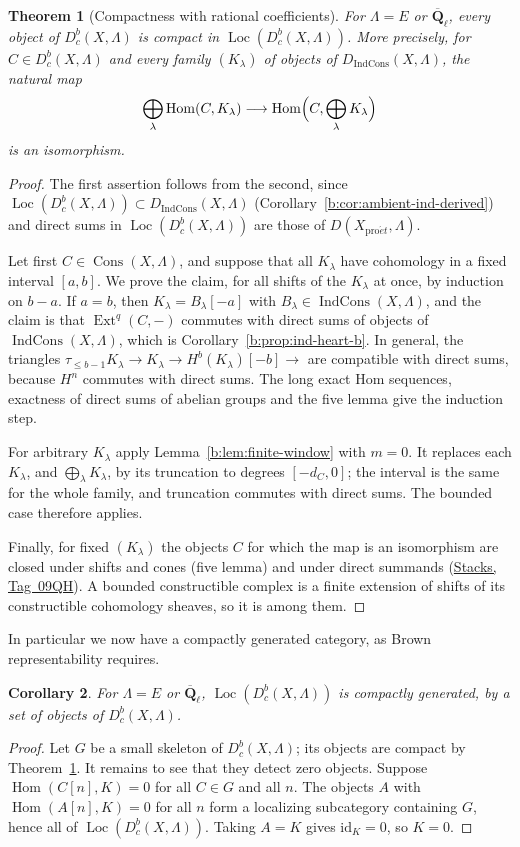 \documentclass[11pt,a4paper]{article}
\numberwithin{equation}{section}
\newtheorem{theorem}{Theorem}[section]
\newtheorem{corollary}[theorem]{Corollary}
\theoremstyle{definition}
\theoremstyle{remark}
\newcommand{\D}{D}
\newcommand{\Dbc}{D^b_c}
\newcommand{\Loc}{\operatorname{Loc}}
\newcommand{\Qbar}{\overline{\mathbf Q}_\ell}
\newcommand{\proet}{\mathrm{pro}\acute{e}t}
\newcommand{\stacks}[1]{\href{https://stacks.math.columbia.edu/tag/#1}{\textnormal{Stacks, Tag~#1}}}
\newcommand{\Hom}{\operatorname{Hom}}
\newcommand{\Ext}{\operatorname{Ext}}
\newcommand{\Cons}{\operatorname{Cons}}
\newcommand{\IndCons}{\operatorname{IndCons}}
\newcommand{\Dic}{D_{\IndCons}}
\begin{document}
\begin{theorem}[Compactness with rational coefficients]\label{b:thm:constructible-compactness}
For $\Lambda=E$ or $\Qbar$, every object of $\Dbc(X,\Lambda)$ is compact in $\Loc(\Dbc(X,\Lambda))$.
More precisely, for $C\in\Dbc(X,\Lambda)$ and every family $(K_\lambda)$
of objects of $\Dic(X,\Lambda)$, the natural map
\[
 \bigoplus_\lambda\Hom(C,K_\lambda)
 \longrightarrow\Hom\Bigl(C,\bigoplus_\lambda K_\lambda\Bigr)
\]
is an isomorphism.
\end{theorem}
\begin{proof}
The first assertion follows from the second, since
$\Loc(\Dbc(X,\Lambda))\subset\Dic(X,\Lambda)$
(Corollary~\ref{b:cor:ambient-ind-derived}) and direct sums in
$\Loc(\Dbc(X,\Lambda))$ are those of $\D(X_{\proet},\Lambda)$.

Let first $C\in\Cons(X,\Lambda)$, and suppose that all $K_\lambda$ have
cohomology in a fixed interval $[a,b]$. We prove the claim, for all
shifts of the $K_\lambda$ at once, by induction on $b-a$. If $a=b$, then
$K_\lambda=B_\lambda[-a]$ with $B_\lambda\in\IndCons(X,\Lambda)$, and the
claim is that $\Ext^q(C,-)$ commutes with direct sums of objects of
$\IndCons(X,\Lambda)$, which is Corollary~\ref{b:prop:ind-heart-b}. In
general, the triangles
$\tau_{\leq b-1}K_\lambda\to K_\lambda\to H^b(K_\lambda)[-b]\to$ are
compatible with direct sums, because $H^n$ commutes with direct sums. The
long exact Hom sequences, exactness of direct sums of abelian groups and
the five lemma give the induction step.

For arbitrary $K_\lambda$ apply Lemma~\ref{b:lem:finite-window} with
$m=0$. It replaces each $K_\lambda$, and $\bigoplus_\lambda K_\lambda$, by
its truncation to degrees $[-d_C,0]$; the interval is the same for the
whole family, and truncation commutes with direct sums. The bounded case
therefore applies.

Finally, for fixed $(K_\lambda)$ the objects $C$ for which the map is an
isomorphism are closed under shifts and cones (five lemma) and under
direct summands (\stacks{09QH}). A bounded constructible complex is a
finite extension of shifts of its constructible cohomology sheaves, so
it is among them.
\end{proof}

In particular we now have a compactly generated category, as Brown
representability requires.

\begin{corollary}\label{b:thm:constructible-compactness-b}
For $\Lambda=E$ or $\Qbar$, $\Loc(\Dbc(X,\Lambda))$ is compactly generated, by a set of objects of
$\Dbc(X,\Lambda)$.
\end{corollary}
\begin{proof}
Let $G$ be a small skeleton of $\Dbc(X,\Lambda)$; its objects are compact
by Theorem~\ref{b:thm:constructible-compactness}. It remains to see that
they detect zero objects. Suppose $\Hom(C[n],K)=0$ for all $C\in G$ and
all $n$. The objects $A$ with $\Hom(A[n],K)=0$ for all $n$ form a
localizing subcategory containing $G$, hence all of $\Loc(\Dbc(X,\Lambda))$.
Taking $A=K$ gives $\mathrm{id}_K=0$, so $K=0$.
\end{proof}
\end{document}
